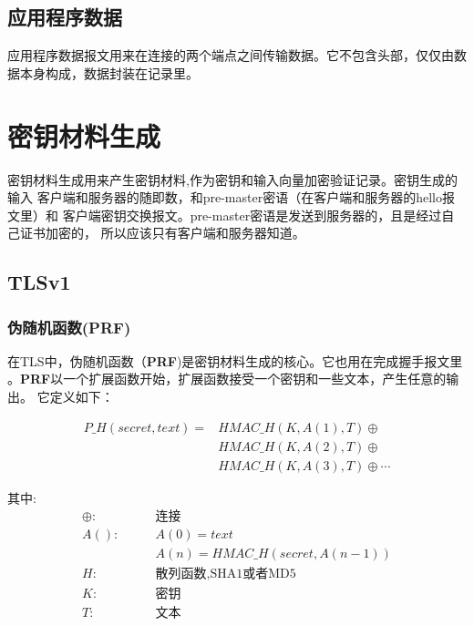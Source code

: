 \documentclass[11pt,dvips]{article}
\newcommand{\bfs}[1]{{\bf{#1}}}
\begin{document}
\subsection{应用程序数据}

应用程序数据报文用来在连接的两个端点之间传输数据。它不包含头部，仅仅由数据本身构成，数据封装在记录里。\\

\section{密钥材料生成}

密钥材料生成用来产生密钥材料,作为密钥和输入向量加密验证记录。密钥生成的输入
客户端和服务器的随即数，和pre-master密语（在客户端和服务器的hello报文里）和
客户端密钥交换报文。pre-master密语是发送到服务器的，且是经过自己证书加密的，
所以应该只有客户端和服务器知道。

\subsection{TLSv1}

\subsubsection{伪随机函数(PRF)}

在TLS中，伪随机函数（\bfs{PRF})是密钥材料生成的核心。它也用在完成握手报文里
。\bfs{PRF}以一个扩展函数开始，扩展函数接受一个密钥和一些文本，产生任意的输出。
它定义如下：


\begin{eqnarray}
        P\_H(secret, text) =& HMAC\_H(K,A(1),T)\oplus {} \nonumber\\
                           &HMAC\_H(K,A(2),T)\oplus  \nonumber \\
                           &HMAC\_H(K,A(3),T)\oplus \cdots \nonumber
\end{eqnarray}

\begin{center}
\begin{minipage}[t]{0.4\textwidth}
        其中:
\begin{align*}
        \oplus:\qquad &\text{连接}\\
            A():\qquad &A(0) = text {} \\
                 \qquad& A(n) = HMAC\_H(secret,A(n-1)) {} \\
              H: \qquad &\text{散列函数,SHA1或者MD5} {}\\
              K: \qquad &\text{密钥} {}\\
              T: \qquad &\text{文本} {}
\end{align*}
\end{minipage}
\end{center}
\end{document}
